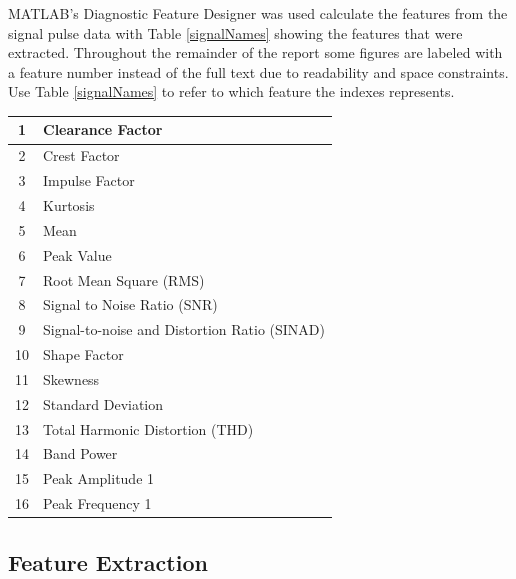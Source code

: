 \documentclass{article}
\begin{document}
MATLAB's Diagnostic Feature Designer was used calculate the features from the signal pulse data with Table \ref{signalNames} showing the features that were extracted. Throughout the remainder of the report some figures are labeled with a feature number instead of the full text due to readability and space constraints. Use Table \ref{signalNames} to refer to which feature the indexes represents.
\begin{center}
\begin{tabular}{ |c|l| }
 \hline
 1 & Clearance Factor \\
 \hline
 2 & Crest Factor \\
 \hline
 3 & Impulse Factor \\
 \hline
 4 & Kurtosis \\
 \hline
 5 & Mean \\
 \hline
 6 & Peak Value \\
 \hline
 7 & Root Mean Square (RMS) \\ 
 \hline              
 8 & Signal to Noise Ratio (SNR) \\
 \hline
 9 & Signal-to-noise and Distortion Ratio (SINAD) \\
 \hline
 10 & Shape Factor \\
 \hline
 11 & Skewness \\
 \hline
 12 & Standard Deviation \\
 \hline
 13 & Total Harmonic Distortion (THD) \\
 \hline
 14 & Band Power \\
 \hline
 15 & Peak Amplitude 1 \\
 \hline
 16 & Peak Frequency 1 \\
 \hline
\end{tabular}
 \label{featureNames}
\end{center}

\subsection{Feature Extraction}
\end{document}

